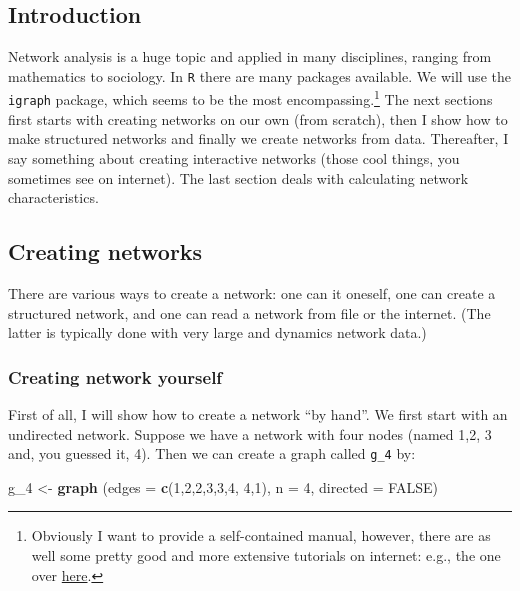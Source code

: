 \documentclass[]{article}
\newenvironment{Shaded}{\begin{snugshade}}{\end{snugshade}}
\newcommand{\KeywordTok}[1]{\textcolor[rgb]{0.13,0.29,0.53}{\textbf{#1}}}
\newcommand{\DataTypeTok}[1]{\textcolor[rgb]{0.13,0.29,0.53}{#1}}
\newcommand{\DecValTok}[1]{\textcolor[rgb]{0.00,0.00,0.81}{#1}}
\newcommand{\StringTok}[1]{\textcolor[rgb]{0.31,0.60,0.02}{#1}}
\newcommand{\OtherTok}[1]{\textcolor[rgb]{0.56,0.35,0.01}{#1}}
\newcommand{\NormalTok}[1]{#1}
\let\rmarkdownfootnote\footnote%
\def\footnote{\protect\rmarkdownfootnote}
\theoremstyle{definition}
\theoremstyle{definition}
\theoremstyle{definition}
\theoremstyle{remark}
\begin{document}
\subsection{Introduction}\label{introduction-1}

Network analysis is a huge topic and applied in many disciplines,
ranging from mathematics to sociology. In \texttt{R} there are many
packages available. We will use the \texttt{igraph} package, which seems
to be the most encompassing.\footnote{Obviously I want to provide a
  self-contained manual, however, there are as well some pretty good and
  more extensive tutorials on internet: e.g., the one over
  \href{http://kateto.net/networks-r-igraph/}{here}.} The next sections
first starts with creating networks on our own (from scratch), then I
show how to make structured networks and finally we create networks from
data. Thereafter, I say something about creating interactive networks
(those cool things, you sometimes see on internet). The last section
deals with calculating network characteristics.

\subsection{Creating networks}\label{creating-networks}

There are various ways to create a network: one can it oneself, one can
create a structured network, and one can read a network from file or the
internet. (The latter is typically done with very large and dynamics
network data.)

\subsubsection{Creating network
yourself}\label{creating-network-yourself}

First of all, I will show how to create a network ``by hand''. We first
start with an undirected network. Suppose we have a network with four
nodes (named 1,2, 3 and, you guessed it, 4). Then we can create a graph
called \texttt{g\_4} by:

\begin{Shaded}
\begin{Highlighting}[]
\NormalTok{g_}\DecValTok{4}\NormalTok{ <-}\StringTok{ }\KeywordTok{graph}\NormalTok{ (}\DataTypeTok{edges =} \KeywordTok{c}\NormalTok{(}\DecValTok{1}\NormalTok{,}\DecValTok{2}\NormalTok{,}\DecValTok{2}\NormalTok{,}\DecValTok{3}\NormalTok{,}\DecValTok{3}\NormalTok{,}\DecValTok{4}\NormalTok{, }\DecValTok{4}\NormalTok{,}\DecValTok{1}\NormalTok{), }\DataTypeTok{n =} \DecValTok{4}\NormalTok{, }\DataTypeTok{directed =} \OtherTok{FALSE}\NormalTok{)}
\end{Highlighting}
\end{Shaded}
\end{document}
